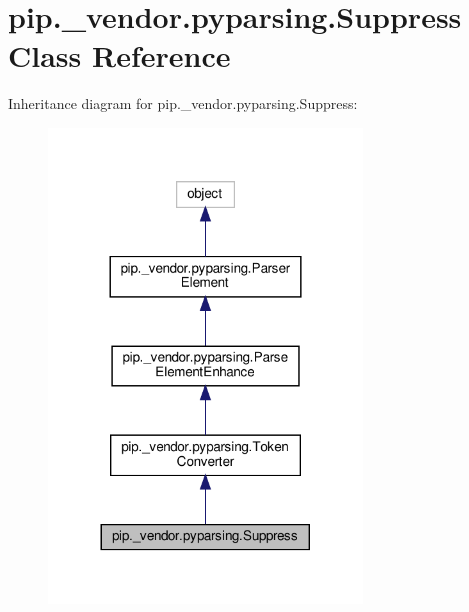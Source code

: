 \hypertarget{classpip_1_1__vendor_1_1pyparsing_1_1Suppress}{}\section{pip.\+\_\+vendor.\+pyparsing.\+Suppress Class Reference}
\label{classpip_1_1__vendor_1_1pyparsing_1_1Suppress}


Inheritance diagram for pip.\+\_\+vendor.\+pyparsing.\+Suppress\+:
\nopagebreak
\begin{figure}[H]
\begin{center}
\leavevmode
\includegraphics[width=236pt]{classpip_1_1__vendor_1_1pyparsing_1_1Suppress__inherit__graph}
\end{center}
\end{figure}


